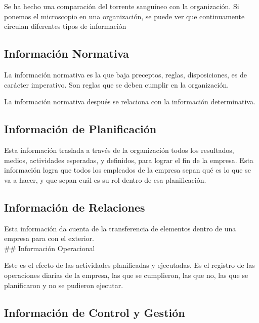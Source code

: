 Se ha hecho una comparación del torrente sanguíneo con la organización.
Si ponemos el microscopio en una organización, se puede ver que
continuamente circulan diferentes tipos de información

\hypertarget{informaciuxf3n-normativa}{%
\subsection{Información Normativa}\label{informaciuxf3n-normativa}}

La información normativa es la que baja preceptos, reglas,
disposiciones, es de carácter imperativo. Son reglas que se deben
cumplir en la organización.

La información normativa después se relaciona con la información
determinativa.

\hypertarget{informaciuxf3n-de-planificaciuxf3n}{%
\subsection{Información de
Planificación}\label{informaciuxf3n-de-planificaciuxf3n}}

Esta información traslada a través de la organización todos los
resultados, medios, actividades esperadas, y definidos, para lograr el
fin de la empresa. Esta información logra que todos los empleados de la
empresa sepan qué es lo que se va a hacer, y que sepan cuál es su rol
dentro de esa planificación.

\hypertarget{informaciuxf3n-de-relaciones}{%
\subsection{Información de
Relaciones}\label{informaciuxf3n-de-relaciones}}

Esta información da cuenta de la transferencia de elementos dentro de
una empresa para con el exterior.\\
\#\# Información Operacional

Este es el efecto de las actividades planificadas y ejecutadas. Es el
registro de las operaciones diarias de la empresa, las que se
cumplieron, las que no, las que se planificaron y no se pudieron
ejecutar.

\hypertarget{informaciuxf3n-de-control-y-gestiuxf3n}{%
\subsection{Información de Control y
Gestión}\label{informaciuxf3n-de-control-y-gestiuxf3n}}

